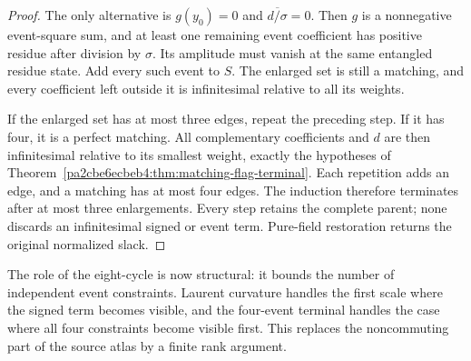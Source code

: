 \begin{proof}
The only alternative is $g(y_0)=0$ and $\overline{d/\sigma}=0$. Then $g$ is a nonnegative event-square sum, and at least one remaining event coefficient has positive residue after division by $\sigma$. Its amplitude must vanish at the same entangled residue state. Add every such event to $S$. The enlarged set is still a matching, and every coefficient left outside it is infinitesimal relative to all its weights.

If the enlarged set has at most three edges, repeat the preceding step. If it has four, it is a perfect matching. All complementary coefficients and $d$ are then infinitesimal relative to its smallest weight, exactly the hypotheses of Theorem~\ref{pa2cbe6ecbeb4:thm:matching-flag-terminal}. Each repetition adds an edge, and a matching has at most four edges. The induction therefore terminates after at most three enlargements. Every step retains the complete parent; none discards an infinitesimal signed or event term. Pure-field restoration returns the original normalized slack.
\end{proof}

The role of the eight-cycle is now structural: it bounds the number of independent event constraints. Laurent curvature handles the first scale where the signed term becomes visible, and the four-event terminal handles the case where all four constraints become visible first. This replaces the noncommuting part of the source atlas by a finite rank argument.
